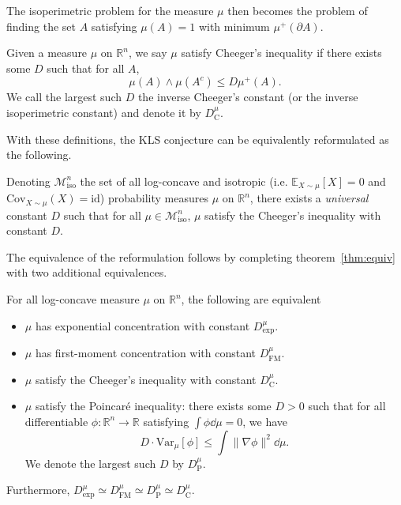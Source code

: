The isoperimetric problem for the measure \(\mu\) then becomes the problem of finding the set \(A\) 
satisfying \(\mu(A) = 1\) with minimum \(\mu^+(\partial A)\). 

\begin{definition}
  Given a measure \(\mu\) on \(\mathbb{R}^n\), we say \(\mu\) satisfy Cheeger's inequality 
  if there exists some \(D\) such that for all \(A\),
  \[\mu(A) \wedge \mu(A^c) \le D\mu^+(A).\]
  We call the largest such \(D\) the inverse Cheeger's constant (or the inverse isoperimetric constant) and 
  denote it by \(D^\mu_{\text{C}}\).
\end{definition}

With these definitions, the KLS conjecture can be equivalently reformulated as the following.

\begin{conjecture}
  Denoting \(\mathscr{M}^n_{\text{iso}}\) the set of all log-concave and isotropic 
  (i.e. \(\mathbb{E}_{X \sim \mu}[X] = 0\) and \(\text{Cov}_{X \sim \mu}(X) = \text{id}\)) probability measures \(\mu\) on 
  \(\mathbb{R}^n\), there exists a \textit{universal} constant \(D\) such that for all 
  \(\mu \in \mathscr{M}^n_{\text{iso}}\), \(\mu\) satisfy the Cheeger's inequality with constant \(D\).
\end{conjecture}

The equivalence of the reformulation follows by completing theorem~\ref{thm:equiv} with two additional 
equivalences.

\begin{theorem}\label{thm:milman2}
  For all log-concave measure \(\mu\) on \(\mathbb{R}^n\), the following are equivalent
  \begin{itemize}
    \item \(\mu\) has exponential concentration with constant \(D^\mu_\text{exp}\).
    \item \(\mu\) has first-moment concentration with constant \(D^\mu_\text{FM}\).
    \item \(\mu\) satisfy the Cheeger's inequality with constant \(D^\mu_\text{C}\).
    \item \(\mu\) satisfy the Poincaré inequality: there exists some \(D > 0\) such that for all 
      differentiable \(\phi : \mathbb{R}^n \to \mathbb{R}\) satisfying \(\int \phi \dd\mu = 0\), we have
      \[D \cdot \text{Var}_\mu[\phi] \le \int \|\nabla \phi\|^2 \dd\mu.\]
      We denote the largest such \(D\) by \(D^\mu_{\text{P}}\).
  \end{itemize}
  Furthermore, \(D^\mu_{\text{exp}} \simeq D^\mu_{\text{FM}} \simeq D^\mu_{\text{P}} \simeq D^\mu_{\text{C}}\).
\end{theorem}

